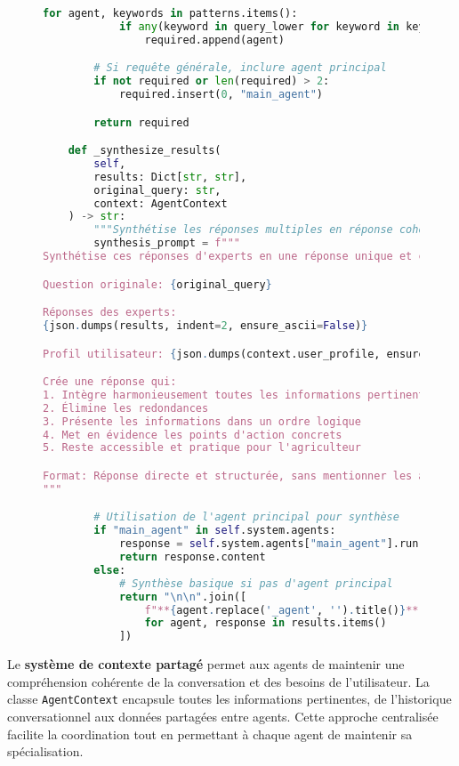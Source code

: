 \begin{figure}[H]
\begin{lstlisting}[language=Python, caption=Système de gestion du contexte inter-agents]
        for agent, keywords in patterns.items():
            if any(keyword in query_lower for keyword in keywords):
                required.append(agent)

        # Si requête générale, inclure agent principal
        if not required or len(required) > 2:
            required.insert(0, "main_agent")

        return required

    def _synthesize_results(
        self,
        results: Dict[str, str],
        original_query: str,
        context: AgentContext
    ) -> str:
        """Synthétise les réponses multiples en réponse cohérente."""
        synthesis_prompt = f"""
Synthétise ces réponses d'experts en une réponse unique et cohérente.

Question originale: {original_query}

Réponses des experts:
{json.dumps(results, indent=2, ensure_ascii=False)}

Profil utilisateur: {json.dumps(context.user_profile, ensure_ascii=False)}

Crée une réponse qui:
1. Intègre harmonieusement toutes les informations pertinentes
2. Élimine les redondances
3. Présente les informations dans un ordre logique
4. Met en évidence les points d'action concrets
5. Reste accessible et pratique pour l'agriculteur

Format: Réponse directe et structurée, sans mentionner les agents individuels.
"""

        # Utilisation de l'agent principal pour synthèse
        if "main_agent" in self.system.agents:
            response = self.system.agents["main_agent"].run(synthesis_prompt)
            return response.content
        else:
            # Synthèse basique si pas d'agent principal
            return "\n\n".join([
                f"**{agent.replace('_agent', '').title()}**: {response}"
                for agent, response in results.items()
            ])
\end{lstlisting}
\end{figure}

Le \textbf{système de contexte partagé} permet aux agents de maintenir une compréhension cohérente de la conversation et des besoins de l'utilisateur. La classe \texttt{AgentContext} encapsule toutes les informations pertinentes, de l'historique conversationnel aux données partagées entre agents. Cette approche centralisée facilite la coordination tout en permettant à chaque agent de maintenir sa spécialisation.

